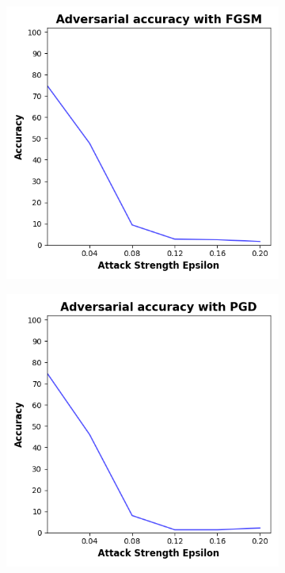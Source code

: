 \begin{figure}[!h]
  \centering

  \begin{subfigure}{0.45\textwidth}
      \includegraphics[width=\linewidth]{figures/evaluation_results/plus-minus/pqc/figures/none-fgsm.png}
      \label{fig:pm3}
  \end{subfigure} \qquad
  \begin{subfigure}{0.45\textwidth}
      \includegraphics[width=\linewidth]{figures/evaluation_results/plus-minus/pqc/figures/none-pgd.png}
      \label{fig:pm4}
  \end{subfigure}


\end{figure}
